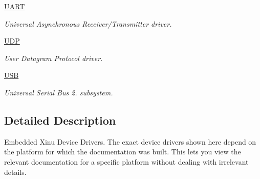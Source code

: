 \begin{DoxyCompactItemize}
\hyperlink{group__uartdriver}{U\-A\-R\-T}
\begin{DoxyCompactList}\small\item\em Universal Asynchronous Receiver/\-Transmitter driver. \end{DoxyCompactList}\item 
\hyperlink{group__udp}{U\-D\-P}
\begin{DoxyCompactList}\small\item\em User Datagram Protocol driver. \end{DoxyCompactList}\item 
\hyperlink{group__usb}{U\-S\-B}
\begin{DoxyCompactList}\small\item\em Universal Serial Bus 2. subsystem. \end{DoxyCompactList}\end{DoxyCompactItemize}


\subsection{Detailed Description}
Embedded Xinu Device Drivers. The exact device drivers shown here depend on the platform for which the documentation was built. This lets you view the relevant documentation for a specific platform without dealing with irrelevant details. 